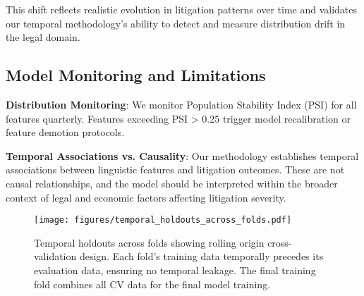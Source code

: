 \documentclass[11pt]{article}
\begin{document}
This shift reflects realistic evolution in litigation patterns over time and validates our temporal methodology's ability to detect and measure distribution drift in the legal domain.

\subsection{Model Monitoring and Limitations}

\textbf{Distribution Monitoring}: We monitor Population Stability Index (PSI) for all features quarterly. Features exceeding PSI > 0.25 trigger model recalibration or feature demotion protocols.

\textbf{Temporal Associations vs. Causality}: Our methodology establishes temporal associations between linguistic features and litigation outcomes. These are not causal relationships, and the model should be interpreted within the broader context of legal and economic factors affecting litigation severity.

\begin{figure}[H]
\centering
\texttt{[image: figures/temporal\_holdouts\_across\_folds.pdf]}
\caption{Temporal holdouts across folds showing rolling origin cross-validation design. Each fold's training data temporally precedes its evaluation data, ensuring no temporal leakage. The final training fold combines all CV data for the final model training.}
\end{figure}
\end{document}
